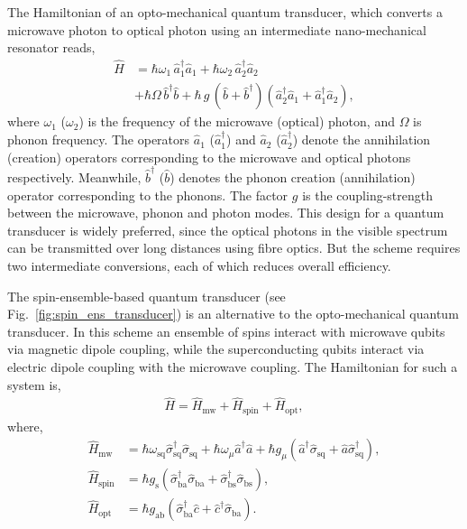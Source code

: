 The Hamiltonian of an opto-mechanical quantum transducer, which converts a microwave photon to optical photon using an intermediate nano-mechanical resonator reads,
\begin{align}
\hat{H} &= \hbar \omega_{1} \, \hat{a}_{1}^{\dag} \hat{a}_{1} + \hbar \omega_{2} \, \hat{a}_{2}^{\dag} \hat{a}_{2} \nonumber\\
&+ \hbar \Omega \, \hat{b}^{\dag} \hat{b} + \hbar \, g \, (\hat{b}+\hat{b}^{\dag}) (\hat{a}_{2}^{\dag} \hat{a}_{1} + \hat{a}_{1}^{\dag} \hat{a}_{2}),
\end{align}
where $\omega_{1}$ ($\omega_{2}$) is the frequency of the microwave (optical) photon, and $\Omega$ is phonon frequency. The operators $\hat{a}_{1}$ ($\hat{a}_{1}^{\dag}$) and $\hat{a}_{2}$ ($\hat{a}_{2}^{\dag}$) denote the annihilation (creation) operators corresponding to the microwave and optical photons respectively. Meanwhile, $\hat{b}^{\dag}$ ($\hat{b}$) denotes the phonon creation (annihilation) operator corresponding to the phonons. The factor $g$ is the coupling-strength between the microwave, phonon and photon modes. This design for a quantum transducer is widely preferred, since the optical photons in the visible spectrum can be transmitted over long distances using fibre optics. But the scheme requires two intermediate conversions, each of which reduces overall efficiency.

The spin-ensemble-based quantum transducer (see Fig.~\ref{fig:spin_ens_transducer}) is an alternative to the opto-mechanical quantum transducer. In this scheme an ensemble of spins interact with microwave qubits via magnetic dipole coupling, while the superconducting qubits interact via electric dipole coupling with the microwave coupling. The Hamiltonian for such a system is,
\begin{align}
\hat{H} = \hat{H}_{\mathrm{mw}} + \hat{H}_{\mathrm{spin}} + \hat{H}_{\mathrm{opt}},
\end{align}
where,
\begin{align}
\hat{H}_{\mathrm{mw}} &= \hbar \omega_\mathrm{sq} \hat\sigma_\mathrm{sq}^{\dag} \hat\sigma_\mathrm{sq} + \hbar \omega_{\mu} \hat{a}^{\dag} \hat{a} + \hbar g_{\mu} (\hat{a}^{\dag} \hat\sigma_\mathrm{sq} + \hat{a} \hat\sigma_\mathrm{sq}^{\dag}),\nonumber \\
\hat{H}_{\mathrm{spin}} &= \hbar g_\mathrm{s} (\hat\sigma_\mathrm{ba}^{\dag} \hat\sigma_\mathrm{ba} + \hat\sigma_\mathrm{bs}^{\dag} \hat\sigma_\mathrm{bs}), \nonumber\\
\hat{H}_{\mathrm{opt}} &= \hbar g_\mathrm{ab} (\hat\sigma_\mathrm{ba}^{\dag} \hat{c} + \hat{c}^{\dag} \hat\sigma_\mathrm{ba}).
\end{align}

